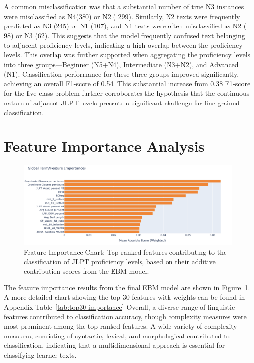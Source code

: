A common misclassification was that a substantial number of true N3 instances were misclassified as N4(380) or N2 (
299).
Similarly, N2 texts were frequently predicted as N3 (245) or N1 (107), and N1 texts were often misclassified as N2 (
98) or N3 (62). This suggests that the model frequently confused text belonging to adjacent proficiency levels,
indicating a high overlap between the proficiency levels. This overlap was further supported when aggregating the
proficiency levels into three groups—Beginner (N5+N4),
Intermediate (N3+N2), and
Advanced (N1).
Classification performance for these three groups improved significantly, achieving an overall F1-score of 0.54. This
substantial increase from 0.38 F1-score for the five-class problem further corroborates the hypothesis that the
continuous nature of adjacent JLPT levels presents a significant challenge for fine-grained classification.

\section{Feature Importance Analysis}
\begin{figure}[h!]
    \centering
    \includegraphics[scale=.4]{img/feature_importance}
    \caption[Feature Importance Chart]{ Feature Importance Chart: Top-ranked features contributing to the classification of JLPT proficiency levels, based on their additive contribution scores from the EBM model.}
    \label{fig:featureimportance}
\end{figure}


The feature importance results from the final EBM model are shown in Figure~\ref{fig:featureimportance}. A
more detailed chart showing the top 30 features with weights can be found in Appendix Table~\ref{tab:top30-importance}
Overall, a
diverse range of linguistic features contributed to classification accuracy, though complexity measures were most
prominent among the top-ranked features. A wide variety of complexity
measures, consisting of syntactic, lexical, and morphological contributed to classification, indicating that a
multidimensional approach is essential for classifying learner texts.

